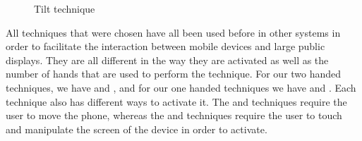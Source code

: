 \begin{figure}[H]
	\caption{Tilt technique}
	\label{fig:tiltTechnique}
\end{figure}

All techniques that were chosen have all been used before in other systems in order to facilitate the interaction between mobile devices and large public displays.
They are all different in the way they are activated as well as the number of hands that are used to perform the technique.
For our two handed techniques, we have \throw and \grab, and for our one handed techniques we have \tilt and \swipe. 
Each technique also has different ways to activate it. 
The \throw and \tilt techniques require the user to move the phone, whereas the \swipe and \grab techniques require the user to touch and manipulate the screen of the device in order to activate. 

